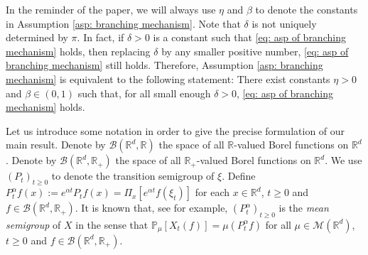 \documentclass[12pt,a4paper]{amsart}
\theoremstyle{plain}
\theoremstyle{definition}
\numberwithin{equation}{section}
\begin{document}
In the reminder of the paper, we will always use $\eta$ and $\beta$ to denote the constants in Assumption  \ref{asp: branching mechanism}.
	Note that $\delta$ is not uniquely determined by $\pi$.
	In fact, if $\delta>0$ is a constant such that \eqref{eq: asp of branching mechanism} holds, then replacing $\delta$ by any smaller positive number, \eqref{eq: asp of branching mechanism} still holds.
	Therefore, Assumption \ref{asp: branching mechanism} is equivalent to the following statement:
	There exist constants $\eta > 0$ and $\beta \in (0,1)$ such that, for all small enough $\delta>0$, \eqref{eq: asp of branching mechanism} holds.


Let us introduce some notation in order to give the precise formulation of our main result.
Denote by $\mathcal B(\mathbb R^d, \mathbb R)$ the space of all $\mathbb R$-valued Borel functions on $\mathbb R^d$.
Denote by $\mathcal B(\mathbb R^d, \mathbb R_+)$ the space of all $\mathbb R_+$-valued Borel functions on $\mathbb R^d$.
We use  $(P_t)_{t\geq 0}$ to denote the transition semigroup of $\xi$.	
Define
\(
P^{\alpha}_t f(x)
  := e^{\alpha t} P_t f(x)
  = \Pi_x [e^{\alpha t}f(\xi_t)]
\)
for each $x\in \mathbb R^d$, $t\geq 0$ and $f\in \mathcal B(\mathbb R^d, \mathbb R_+)$.
It is known that, see \cite[Proposition 2.27]{Li2011Measure-valued} for example, $(P^\alpha_t)_{t\geq 0}$ is the \emph{mean semigroup} of $X$ in the sense that
\(
  \mathbb{P}_{\mu}[X_t (f)]  = \mu( P^\alpha_t f)
\)
for all $\mu\in \mathcal M(\mathbb R^d)$, $t\geq 0$ and $f\in \mathcal B(\mathbb R^d, \mathbb R_+)$.
\end{document}
